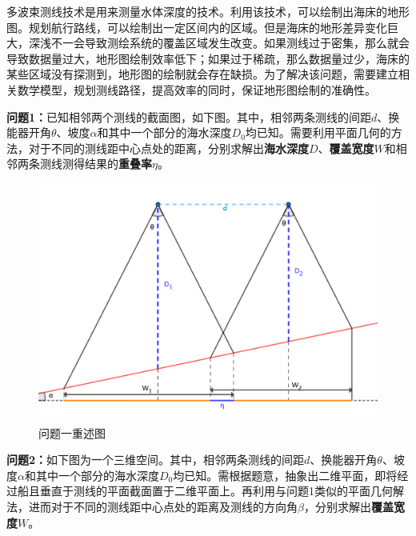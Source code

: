 \setcounter{page}{1}




多波束测线技术是用来测量水体深度的技术。利用该技术，可以绘制出海床的地形图。规划航行路线，可以绘制出一定区间内的区域。但是海床的地形差异变化巨大，深浅不一会导致测绘系统的覆盖区域发生改变。如果测线过于密集，那么就会导致数据量过大，地形图绘制效率低下；如果过于稀疏，那么数据量过少，海床的某些区域没有探测到，地形图的绘制就会存在缺损。为了解决该问题，需要建立相关数学模型，规划测线路径，提高效率的同时，保证地形图绘制的准确性。


\textbf{问题1：}已知相邻两个测线的截面图，如下图。其中，相邻两条测线的间距$d$、换能器开角$\theta$、坡度$\alpha$和其中一个部分的海水深度$D_0$均已知。需要利用平面几何的方法，对于不同的测线距中心点处的距离，分别求解出\textbf{海水深度}$D$、\textbf{覆盖宽度}$W$和相邻两条测线测得结果的\textbf{重叠率}$\eta$。

\begin{figure}[h]   
    \centering
    \includegraphics[scale=0.3]{res/img/问题一重述图.png}
    \caption{问题一重述图}
    \label{fig:问题一重述图}
\end{figure}

\textbf{问题2：}如下图为一个三维空间。其中，相邻两条测线的间距$d$、换能器开角$\theta$、坡度$\alpha$和其中一个部分的海水深度$D_0$均已知。需根据题意，抽象出二维平面，即将经过船且垂直于测线的平面截面置于二维平面上。再利用与问题1类似的平面几何解法，进而对于不同的测线距中心点处的距离及测线的方向角$\beta$，分别求解出\textbf{覆盖宽度}$W$。

